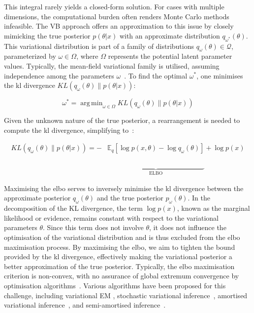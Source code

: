 \documentclass[3p,review,authoryear]{elsarticle}
\DeclareMathOperator*{\argmin}{arg\,min}
\begin{document}
This integral rarely yields a closed-form solution.
For cases with multiple dimensions, the computational burden often renders Monte Carlo methods infeasible.
The VB approach offers an approximation to this issue by closely mimicking the true posterior $p(\theta|x)$ with an approximate distribution $q_{\omega^*}(\theta)$. This variational distribution is part of a family of distributions $q_\omega(\theta)\in \mathcal{Q}$, parameterized by $\omega \in \Omega$, where $\Omega$ represents the potential latent parameter values.
Typically, the mean-field variational family is utilised, assuming independence among the parameters $\omega$~\citep{Blei_2017}. 
To find the optimal $\omega^*$, one minimises the \gls{kl} divergence $KL(q_\omega(\theta) \parallel p(\theta|x))$:

\begin{equation}
\omega^* = \argmin_{\omega \in \Omega}KL(q_\omega(\theta) \parallel p(\theta|x))
\label{eq:optim}
\end{equation}

Given the unknown nature of the true posterior, a rearrangement is needed to compute the \gls{kl} divergence, simplifying to~\citep[Chapter~10]{murphy2023probabilistic}:

\begin{align*}
KL(q_\omega(\theta) \parallel p(\theta|x)) = - & \mathbb{E}_q\left[\log p(x,\theta) - \log q_\omega(\theta)\right] + \log p(x)\\
& \underbrace{\phantom{\mathbb{E}_q\left[\log p(x,\theta) - \log q_\omega(\theta)\right]}}_{\text{ELBO}}
\label{eq:kl_divergence}
\end{align*}

Maximising the \gls{elbo} serves to inversely minimise the \gls{kl} divergence between the approximate posterior \(q_\omega(\theta)\) and the true posterior \(p_\omega(\theta)\).
In the decomposition of the KL divergence, the term \(\log p(x)\), known as the marginal likelihood or evidence, remains constant with respect to the variational parameters \(\theta\).
Since this term does not involve \(\theta\), it does not influence the optimisation of the variational distribution and is thus excluded from the \gls{elbo} maximisation process.
By maximising the \gls{elbo}, we aim to tighten the bound provided by the \gls{kl} divergence, effectively making the variational posterior a better approximation of the true posterior.
Typically, the \gls{elbo} maximisation criterion is non-convex, with no assurance of global extremum convergence by optimisation algorithms~\citep[Chapter~10]{murphy2023probabilistic}.
Various algorithms have been proposed for this challenge, including variational EM \citep{bernardo2003variational}, stochastic variational inference~\citep{hoffman2013stochastic, sashank2018convergence}, amortised variational inference~\citep{gershman2014amortized, le2017inference}, and semi-amortised inference~\citep{kim2018semi}.
\end{document}
